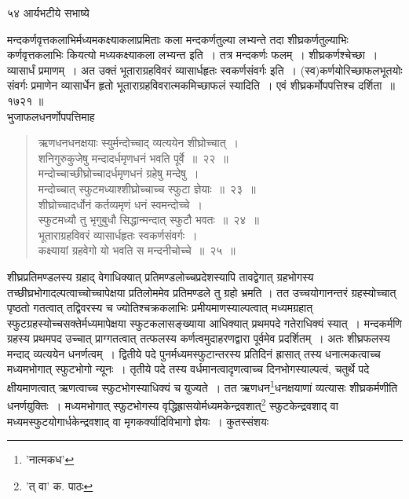 \documentclass[11pt, openany]{book}
\begin{document}
{{{{{\vspace{3cm} ५४\hspace{4cm} आर्यभटीये सभाष्ये 

\vspace{0.3cm}
\noindent मन्दकर्णवृत्तकलाभिर्मध्यमकक्ष्याकलाप्रमिताः कला मन्दकर्णतुल्या लभ्यन्ते तदा शीघ्रकर्णतुल्याभिः कर्णवृत्तकलाभिः कियत्यो मध्यकक्ष्याकला लभ्यन्त इति~। तत्र मन्दकर्णः फलम्~। शीघ्रकर्णश्चेच्छा~। व्यासार्धं प्रमाणम्~। अत उक्तं {\qt भूताराग्रहविवरं व्यासार्धहृतः स्वकर्णसंवर्गः} इति~। (स्व)कर्णयोरिच्छाफलभूतयोः संवर्गः प्रमाणेन व्यासार्धेन हृतो भूताराग्रहविवरात्मकमिच्छाफलं स्यादिति~। एवं शीघ्रकर्मोपपत्तिश्च दर्शिता~॥ १७\textendash २१ ॥ \\

भुजाफलधनर्णोपपत्तिमाह\textendash 

\begin{quote}
{\ab ऋणधनधनक्षयाः स्युर्मन्दोच्चाद् व्यत्ययेन शीघ्रोच्चात्~।\\
शनिगुरुकुजेषु मन्दादर्धमृणधनं भवति पूर्वे~॥~२२~॥ \\
मन्दोच्चाच्छीघ्रोच्चादर्धमृणधनं ग्रहेषु मन्देषु~।\\
मन्दोच्चात् स्फुटमध्याश्शीघ्रोच्चाच्च स्फुटा ज्ञेयाः~॥~२३~॥\\
शीघ्रोच्चादर्धोनं कर्तव्यमृणं धनं स्वमन्दोच्चे~।\\
स्फुटमध्यौ तु भृगुबुधौ सिद्धान्मन्दात् स्फुटौ भवतः~॥~२४~॥\\
भूताराग्रहविवरं व्यासार्धहृतः स्वकर्णसंवर्गः~।\\
कक्ष्यायां ग्रहवेगो यो भवति स मन्दनीचोच्चे~॥~२५~॥}
\end{quote}

शीघ्रप्रतिमण्डलस्य ग्रहाद् वेगाधिक्यात् प्रतिमण्डलोच्चप्रदेशस्यापि तावद्वेगात् ग्रहभोगस्य तच्छीघ्रभोगादल्पत्वाच्चोच्चापेक्षया प्रतिलोममेव
प्रतिमण्डले तु ग्रहो भ्रमति । तत उच्चयोगानन्तरं ग्रहस्योच्चात् पृष्ठतो गतत्वात् तद्विवरस्य च ज्योतिश्चक्रकलाभिः प्रमीयमाणस्याल्पत्वात् मध्यमग्रहात् स्फुटग्रहस्योच्चसक्तेर्मध्यमापेक्षया स्फुटकलासङ्ख्याया आधिक्यात् प्रथमपदे गतेराधिक्यं स्यात्~। मन्दकर्मणि ग्रहस्य प्रथमपद उच्चात्
प्राग्गतत्वात् तत्फलस्य कर्णत्वमुदाहरणद्वारा पूर्वमेव प्रदर्शितम्~। अतः शीघ्रफलस्य मन्दाद् व्यत्ययेन धनर्णत्वम्~। द्वितीये पदे
पुनर्मध्यमस्फुटान्तरस्य प्रतिदिनं ह्रासात् तस्य धनात्मकत्वाच्च मध्यमभोगात् स्फुटभोगो न्यूनः~। तृतीये पदे तस्य वर्धमानत्वादृणत्वाच्च दिनभोगस्याल्पत्वं, चतुर्थे पदे क्षीयमाणत्वात् ऋणत्वाच्च स्फुटभोगस्याधिक्यं च युज्यते~। तत ऋणधन\renewcommand{\thefootnote}{१}\footnote{'नात्मकध'}धनक्षयाणां व्यत्यासः शीघ्रकर्मणीति धनर्णयुक्तिः~। मध्यमभोगात् स्फुटभोगस्य वृद्धिह्रासयोर्मध्यमकेन्द्रवशात्\renewcommand{\thefootnote}{२}\footnote{'त् वा' क. पाठः} स्फुटकेन्द्रवशाद् वा मध्यमस्फुटयोगार्धकेन्द्रवशाद् वा मृगकर्क्यादिविभागो ज्ञेयः~। कुतस्संशयः\textendash

}}}}}
\end{document}
